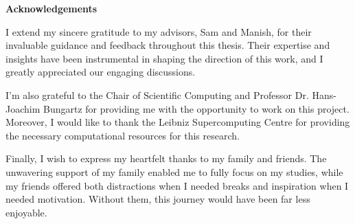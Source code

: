 {}
\vspace*{2cm}
\begin{center}
    {\Large \textbf{Acknowledgements}}
\end{center}
\vspace{1cm}

I extend my sincere gratitude to my advisors, Sam and Manish, for their invaluable guidance and feedback throughout this thesis. Their expertise and insights have been instrumental in shaping the direction of this work, and I greatly appreciated our engaging discussions.

\medskip

I'm also grateful to the Chair of Scientific Computing and Professor Dr. Hans-Joachim Bungartz for providing me with the opportunity to work on this project. Moreover, I would like to thank the Leibniz Supercomputing Centre for providing the necessary computational resources for this research.

\medskip

Finally, I wish to express my heartfelt thanks to my family and friends. The unwavering support of my family enabled me to fully focus on my studies, while my friends offered both distractions when I needed breaks and inspiration when I needed motivation. Without them, this journey would have been far less enjoyable.